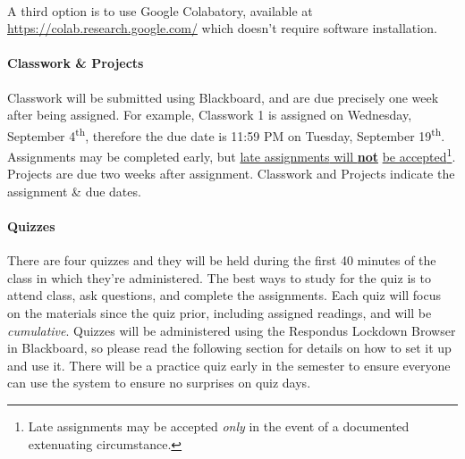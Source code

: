 \documentclass[letter,10pt]{article}
\begin{document}
\paragraph{}A third option is to use Google Colabatory, available at \url{https://colab.research.google.com/} which doesn't require software installation.

\label{sec:cwhw}
\paragraph{Classwork \& Projects}Classwork will be submitted using Blackboard, and are due precisely one week after being assigned. For example, Classwork 1 is assigned on Wednesday, September 4\textsuperscript{th}, therefore the due date is 11:59 PM on Tuesday, September 19\textsuperscript{th}. Assignments may be completed early, but \underline{\hypertarget{sec:cwhw}{late assignments} will \textbf{not}} \underline{be accepted}\footnote{Late assignments may be accepted \textit{only} in the event of a documented extenuating circumstance.}. Projects are due two weeks after assignment. Classwork and Projects indicate the assignment \& due dates.

\paragraph{Quizzes}There are four quizzes and they will be held during the first 40 minutes of the class in which they're administered. The best ways to study for the quiz is to attend class, ask questions, and complete the assignments. Each quiz will focus on the materials since the quiz prior, including assigned readings, and will be \textit{cumulative}. Quizzes will be administered using the Respondus Lockdown Browser in Blackboard, so please read the following section for details on how to set it up and use it. There will be a practice quiz early in the semester to ensure everyone can use the system to ensure no surprises on quiz days.
\end{document}
